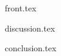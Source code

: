 
\frontmatter

{front.tex}

\tableofcontents*

\mainmatter

{discussion.tex}

{conclusion.tex}

\backmatter

\printbibliography
